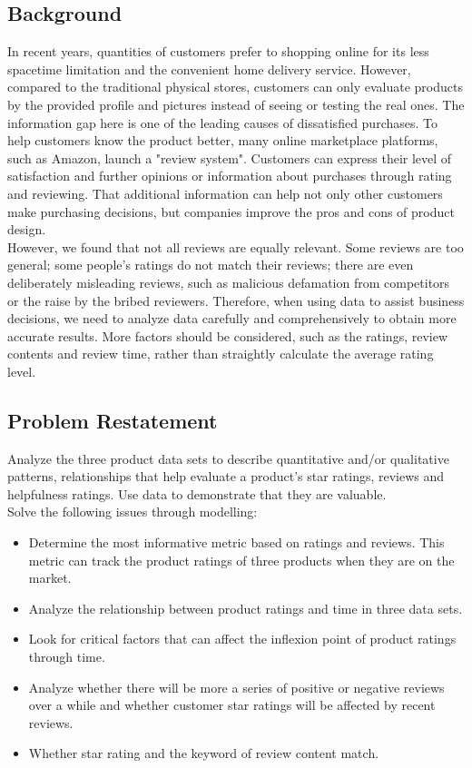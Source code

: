 \documentclass{mcmthesis}
\begin{document}
\subsection{Background}
In recent years, quantities of customers prefer to shopping online for its less spacetime limitation and the convenient home delivery service. However, compared to the traditional physical stores, customers can only evaluate products by the provided profile and pictures instead of seeing or testing the real ones. The information gap here is one of the leading causes of dissatisfied purchases. To help customers know the product better, many online marketplace platforms, such as Amazon, launch a "review system". Customers can express their level of satisfaction and further opinions or information about purchases through rating and reviewing. That additional information can help not only other customers make purchasing decisions, but companies improve the pros and cons of product design.\\

However, we found that not all reviews are equally relevant. Some reviews are too general; some people's ratings do not match their reviews; there are even deliberately misleading reviews, such as malicious defamation from competitors or the raise by the bribed reviewers. Therefore, when using data to assist business decisions, we need to analyze data carefully and comprehensively to obtain more accurate results. More factors should be considered, such as the ratings, review contents and review time, rather than straightly calculate the average rating level.

\subsection{Problem Restatement}
Analyze the three product data sets to describe quantitative and/or qualitative patterns, relationships that help evaluate a product's star ratings, reviews and helpfulness ratings. Use data to demonstrate that they are valuable.\\

Solve the following issues through modelling:
\begin{itemize}
  \item Determine the most informative metric based on ratings and reviews. This metric can track the product ratings of three products when they are on the market.
  
  \item Analyze the relationship between product ratings and time in three data sets.
  
  \item Look for critical factors that can affect the inflexion point of product ratings through time.
  
  \item Analyze whether there will be more a series of positive or negative reviews over a while and whether customer star ratings will be affected by recent reviews.
  
  \item Whether star rating and the keyword of review content match.
\end{itemize}
\end{document}
